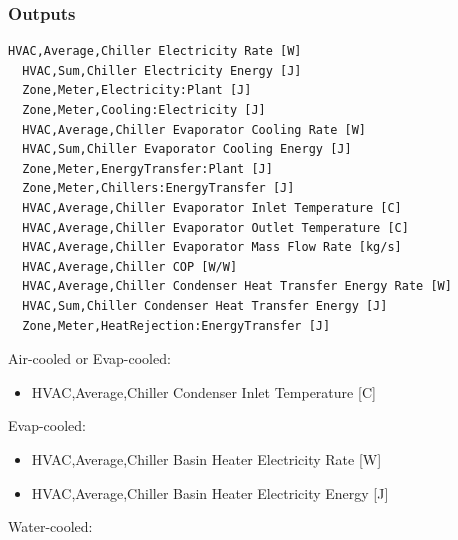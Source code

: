 \subsubsection{Outputs}\label{outputs-6-006}

\begin{lstlisting}
HVAC,Average,Chiller Electricity Rate [W]
  HVAC,Sum,Chiller Electricity Energy [J]
  Zone,Meter,Electricity:Plant [J]
  Zone,Meter,Cooling:Electricity [J]
  HVAC,Average,Chiller Evaporator Cooling Rate [W]
  HVAC,Sum,Chiller Evaporator Cooling Energy [J]
  Zone,Meter,EnergyTransfer:Plant [J]
  Zone,Meter,Chillers:EnergyTransfer [J]
  HVAC,Average,Chiller Evaporator Inlet Temperature [C]
  HVAC,Average,Chiller Evaporator Outlet Temperature [C]
  HVAC,Average,Chiller Evaporator Mass Flow Rate [kg/s]
  HVAC,Average,Chiller COP [W/W]
  HVAC,Average,Chiller Condenser Heat Transfer Energy Rate [W]
  HVAC,Sum,Chiller Condenser Heat Transfer Energy [J]
  Zone,Meter,HeatRejection:EnergyTransfer [J]
\end{lstlisting}

Air-cooled or Evap-cooled:

\begin{itemize}
    \tightlist
    \item
    HVAC,Average,Chiller Condenser Inlet Temperature {[}C{]}
\end{itemize}

Evap-cooled:

\begin{itemize}
    \item
    HVAC,Average,Chiller Basin Heater Electricity Rate {[}W{]}
    \item
    HVAC,Average,Chiller Basin Heater Electricity Energy {[}J{]}
\end{itemize}

Water-cooled:

